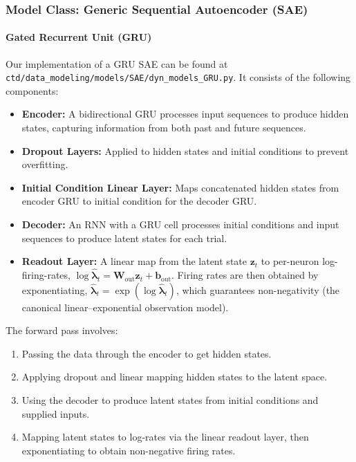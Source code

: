 \documentclass{article}
\begin{document}
\subsubsection{Model Class: Generic Sequential Autoencoder (SAE) \label{appendix:DD-SAE}}

\paragraph{Gated Recurrent Unit (GRU) \label{DDGRU}}
Our implementation of a GRU SAE can be found at \texttt{ctd/data\_modeling/models/SAE/dyn\_models\_GRU.py}. It consists of the following components:

\begin{itemize}
    \item \textbf{Encoder:} A bidirectional GRU processes input sequences to produce hidden states, capturing information from both past and future sequences.
    \item \textbf{Dropout Layers:} Applied to hidden states and initial conditions to prevent overfitting.
    \item \textbf{Initial Condition Linear Layer:} Maps concatenated hidden states from encoder GRU to initial condition for the decoder GRU.
    \item \textbf{Decoder:} An RNN with a GRU cell processes initial conditions and input sequences to produce latent states for each trial.
    \item \textbf{Readout Layer:} A linear map from the latent state $\mathbf{z}_t$ to per-neuron log-firing-rates, $\log\hat{\boldsymbol{\lambda}}_t = \mathbf{W}_{\text{out}} \mathbf{z}_t + \mathbf{b}_{\text{out}}$. Firing rates are then obtained by exponentiating, $\hat{\boldsymbol{\lambda}}_t = \exp(\log\hat{\boldsymbol{\lambda}}_t)$, which guarantees non-negativity (the canonical linear--exponential observation model).
\end{itemize}

The forward pass involves:
\begin{enumerate}
    \item Passing the data through the encoder to get hidden states.
    \item Applying dropout and linear mapping hidden states to the latent space.
    \item Using the decoder to produce latent states from initial conditions and supplied inputs.
    \item Mapping latent states to log-rates via the linear readout layer, then exponentiating to obtain non-negative firing rates.
\end{enumerate}
\end{document}
